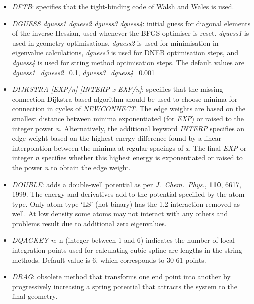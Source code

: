 \documentclass[12pt,a4paper,dvips]{article}
\begin{document}
\begin{itemize}
\item {\it DFTB\/}: specifies that the tight-binding code of Walsh and Wales\cite{WalshW98}
      is used.

\item {\it DGUESS dguess1 dguess2 dguess3 dguess4\/}: initial guess for diagonal elements of the inverse
      Hessian, used whenever the BFGS optimiser is reset. {\it dguess1\/} is used in
      geometry optimisations, {\it dguess2\/} is used for minimisation in
      eigenvalue calculations, {\it dguess3\/} is used for DNEB optimisation
      steps, and {\it dguess4\/} is used for string method optimisation steps.
      The default values are {\it dguess1=dguess2}=0.1, {\it dguess3=dguess4}=0.001

\item {\it DIJKSTRA [EXP/n] [INTERP x EXP/n]\/}: specifies that the missing connection
Dijkstra-based algorithm\cite{CarrTW05} should be used to choose minima for connection in cycles
of {\it NEWCONNECT\/}.
The edge weights are based on the smallest distance between minima exponentiated (for {\it EXP}) or
raised to the integer power {\it n}.
Alternatively, the additional keyword {\it INTERP\/} specifies an edge weight based on
the highest energy difference found by a linear interpolation between the minima at regular spacings
of {\it x}. 
The final {\it EXP\/} or integer {\it n} specifies whether this highest energy is exponentiated
or raised to the power {\it n} to obtain the edge weight.

\item {\it DOUBLE\/}: adds a double-well potential as per {\it J.~Chem.~Phys.\/},
        {\bf 110}, 6617, 1999. The
        energy and derivatives add to the potential specified by the atom
        type. Only atom type
        `LS' (not binary) has the 1,2 interaction removed as well.
        At low density some atoms may not interact with any others and
        problems result due to additional zero eigenvalues.

\item {\it DQAGKEY n}: n (integer between 1 and 6) indicates the number of local 
integration points used for calculating cubic spline arc lengths in the string methods. 
Default value is 6, which corresponds to 30-61 points. 

\item {\it DRAG\/}: obsolete method that transforms one end point into another
by progressively increasing a spring potential that attracts the system to the
final geometry.


\end{itemize}
\end{document}
